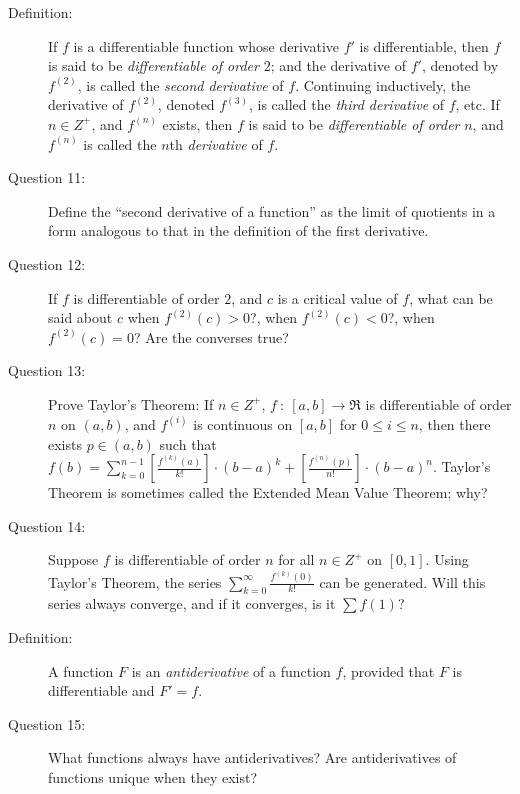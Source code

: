 \documentclass{article}
\begin{document}
\begin{description}
  \item[Definition:] If $f$ is a differentiable function whose derivative $f'$ is differentiable, then $f$ is said to be \emph{differentiable of order} $2$; and the derivative of $f'$, denoted by $f^{(2)}$, is called the \emph{second derivative} of $f$. Continuing inductively, the derivative of $f^{(2)}$, denoted $f^{(3)}$, is called the \emph{third derivative} of $f$, etc. If $n \in Z^+$, and $f^{(n)}$ exists, then $f$ is said to be \emph{differentiable of order} $n$, and $f^{(n)}$ is called the $n$th \emph{derivative} of $f$.

  \item[Question 11:] Define the ``second derivative of a function'' as the limit of quotients in a form analogous to that in the definition of the first derivative.

  \item[Question 12:] If $f$ is differentiable of order $2$, and $c$ is a critical value of $f$, what can be said about $c$ when $f^{(2)}(c) > 0$?, when $f^{(2)}(c) < 0$?, when $f^{(2)}(c) = 0$? Are the converses true?

  \item[Question 13:] Prove Taylor's Theorem: If $n \in Z^+$, $f\ :\ [a,b] \to \Re$ is differentiable of order $n$ on $(a,b)$, and $f^{(i)}$ is continuous on $[a,b]$ for $0 \leq i \leq n$, then there exists $p \in (a,b)$ such that $\displaystyle f(b) = \sum_{k=0}^{n-1} \left[ \frac{ f^{(k)}(a) }{k!} \right] \cdot (b-a)^k + \left[ \frac{ f^{(n)}(p) }{n!} \right] \cdot (b-a)^n$. Taylor's Theorem is sometimes called the Extended Mean Value Theorem; why?

  \item[Question 14:] Suppose $f$ is differentiable of order $n$ for all $n \in Z^+$ on $[0,1]$. Using Taylor's Theorem, the series $\displaystyle \sum_{k=0}^\infty \frac{ f^{(k)}(0) }{k!}$ can be generated. Will this series always converge, and if it converges, is it $\sum f(1)$?

  \item[Definition:] A function $F$ is an \emph{antiderivative} of a function $f$, provided that $F$ is differentiable and $F' = f$.

  \item[Question 15:] What functions always have antiderivatives? Are antiderivatives of functions unique when they exist?

\end{description}
\end{document}
